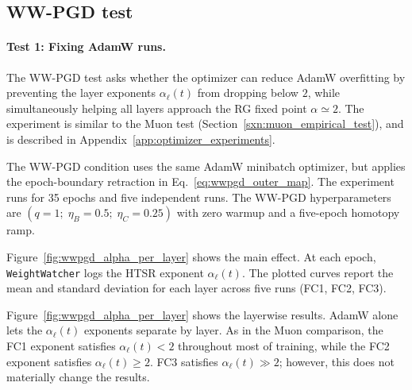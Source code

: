 \documentclass[10pt,twocolumn]{article}
\newcommand{\WW}{\texttt{WeightWatcher}}
\newcommand{\takeaway}[1]{%
  \par\vspace{4pt}\noindent\textcolor{boxblue}{#1}%
}
\begin{document}
\subsection{WW-PGD test}
\label{sxn:wwpgd_empirical_test}


\paragraph{Test 1: Fixing AdamW runs.} 
The WW-PGD test asks whether the optimizer can reduce AdamW overfitting by preventing the layer exponents
$\alpha_\ell(t)$ from dropping below $2$, while simultaneously helping all layers approach the RG fixed point
$\alpha\simeq 2$. The experiment is similar to the Muon test (Section~\ref{sxn:muon_empirical_test}), and is described in
Appendix~\ref{app:optimizer_experiments}.

The WW-PGD condition uses the same AdamW minibatch optimizer,
but applies the epoch-boundary retraction in Eq.~\eqref{eq:wwpgd_outer_map}.
The experiment runs for 35 epochs and five independent runs. The WW-PGD hyperparameters are
$(q=1;\;\eta_B=0.5;\;\eta_C=0.25)$ with zero warmup and a five-epoch homotopy ramp.

Figure~\ref{fig:wwpgd_alpha_per_layer} shows the main effect.
At each epoch, \WW{} logs the HTSR exponent $\alpha_\ell(t)$.
The plotted curves report the mean and standard deviation for each layer across five runs
(FC1, FC2, FC3).

Figure~\ref{fig:wwpgd_alpha_per_layer} shows the layerwise results.
AdamW alone lets the $\alpha_\ell(t)$ exponents separate by layer.
As in the Muon comparison, the FC1 exponent satisfies $\alpha_\ell(t)<2$ throughout most of training, while the FC2 exponent satisfies $\alpha_\ell(t)\geq2$.
FC3  satisfies $\alpha_\ell(t)\gg2$; however, this does not materially change the results.
\end{document}

